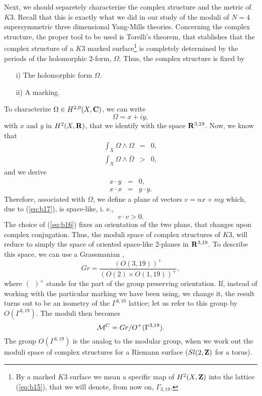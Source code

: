 Next, we should separetely characterize the complex structure and
the metric of $K3$. Recall that this is exactly what we did in
our study of the moduli of $N\!=\!4$ supersymmetric three
dimensional Yang-Mills theories. Concerning the complex
structure, the proper tool to be used is Torelli's theorem, that
stablishes that the complex structure of a $K3$ marked surface\footnote{By 
a marked $K3$ surface we mean a specific map of $H^2(X,{\bf Z})$ into the 
lattice (\ref{eq:b15}), that we will denote, from now on, $\Gamma_{3,19}$.} is
completely determined by the periods of the holomorphic $2$-form,
$\Omega$. Thus, the complex structure is fixed by
\begin{itemize}
	\item[{i)}] The holomorphic form $\Omega$.
	\item[{ii)}] A marking.
\end{itemize}
To characterize $\Omega \in H^{2,0}(X,{\bf C})$, we can write
\begin{equation}
\Omega = x + iy,
\label{eq:b16}
\end{equation}
with $x$ and $y$ in $H^2(X,{\bf R})$, that we identify with the
space ${\bf R}^{3,19}$. Now, we know that
\begin{eqnarray}
\int_X \Omega \wedge \Omega & = & 0, \nonumber \\
\int_X \Omega \wedge \bar{\Omega} & > & 0, 
\label{eq:b17}
\end{eqnarray}
and we derive
\begin{eqnarray}
x \cdot y & = & 0, \nonumber \\
x \cdot x & = & y \cdot y.
\label{eq:b18}
\end{eqnarray}
Therefore, associated with $\Omega$, we define a plane of vectors
$v=nx+my$ which, due to (\ref{eq:b17}), is space-like, i. e.,
\begin{equation}
v \cdot v >0.
\label{eq:b19}
\end{equation}
The choice of (\ref{eq:b16}) fixes an orientation of the two
plane, that changes upon complex conjugation. Thus, the moduli
space of complex structures of $K3$, will reduce to simply the
space of oriented space-like $2$-planes in ${\bf R}^{3,19}$. To
describe this space, we can use a Grassmanian \cite{Aspinwall},
\begin{equation}
Gr = \frac {(O(3,19))^+}{(O(2)\times O(1,19))^+},
\label{eq:b20}
\end{equation}
where $(\: \:)^+$ stands for the part of the group preserving
orientation. If, instead of working with the particular marking
we have been using, we change it, the result turns out to be an
isometry of the $\Gamma^{3,19}$ lattice; let us refer to this
group by $O(\Gamma^{3,19})$. The moduli then becomes
\begin{equation}
{\cal M}^C = Gr/O^+(\Gamma^{3,19}).
\label{eq:b21}
\end{equation}
The group $O(\Gamma^{3,19})$ is the analog to the modular group, when we work out the moduli 
space of complex structures for a Riemann surface ($Sl(2,{\bf Z})$ for a torus).
 
